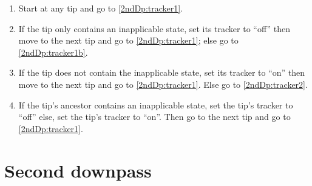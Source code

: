 \documentclass[a4paper,12pt]{article}
\begin{document}
\begin{enumerate}
    \item \label{2ndDp:tracker} Start at any tip and go to \ref{2ndDp:tracker1}.
    \item \label{2ndDp:tracker1} If the tip only contains an inapplicable state, set its tracker to ``off'' then move to the next tip and go to \ref{2ndDp:tracker1}; else go to \ref{2ndDp:tracker1b}.
    \item \label{2ndDp:tracker1b} If the tip does not contain the inapplicable state, set its tracker to ``on'' then move to the next tip and go to \ref{2ndDp:tracker1}. Else go to \ref{2ndDp:tracker2}.
    \item \label{2ndDp:tracker2} If the tip's ancestor contains an inapplicable state, set the tip's tracker to ``off'' else, set the tip's tracker to ``on''. Then go to the next tip and go to \ref{2ndDp:tracker1}.
\end{enumerate}

\section{Second downpass} \label{2ndDp}
\end{document}
